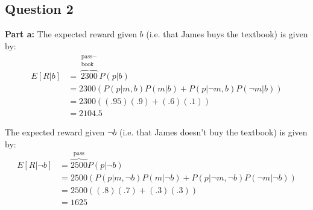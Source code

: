 \documentclass{article}
\newcommand{\icol}[1]{%
  \begin{bsmallmatrix}#1\end{bsmallmatrix}%
}
\begin{document}



\subsection*{Question 2}
\noindent\textbf{Part a:} The expected reward given $b$ (i.e. that James buys the textbook) is given by:
\begin{align*}
  E[R|b]&=\overbrace{2300}^{\substack{\text{pass}-\\\text{book}}} P(p|b)\tag{def. of conditional expectation}\\
  &=2300(P(p|m,b)P(m|b)+P(p|\neg m,b)P(\neg m|b))\tag{chain rule \& total probability}\\
  &=2300((.95)(.9)+(.6)(.1))\\
  &=2104.5
\end{align*}

The expected reward given $\neg b$ (i.e. that James doesn't buy the textbook) is given by:
\begin{align*}
  E[R|\neg b]&=\overbrace{2500}^{\text{pass}} P(p|\neg b)\tag{def. of conditional expectation}\\
  &=2500(P(p|m,\neg b)P(m|\neg b)+P(p|\neg m,\neg b)P(\neg m|\neg b))\tag{chain rule \& total probability}\\
  &=2500((.8)(.7)+(.3)(.3))\\
  &=1625
\end{align*}
\end{document}
